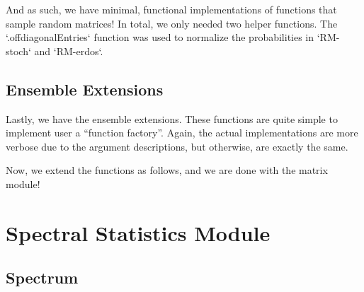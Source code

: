 And as such, we have minimal, functional implementations of functions that sample random matrices! In total, we only needed two helper functions. The `.offdiagonalEntries` function was used to normalize the probabilities in `RM-stoch` and `RM-erdos`.

\newpage

\newpage
\subsection{Ensemble Extensions}

Lastly, we have the ensemble extensions. These functions are quite simple to implement user a ``function factory''. Again, the actual implementations are more verbose due to the argument descriptions, but otherwise, are exactly the same.


Now, we extend the functions as follows, and we are done with the matrix module!


\newpage
\section{Spectral Statistics Module}

\subsection{Spectrum}

